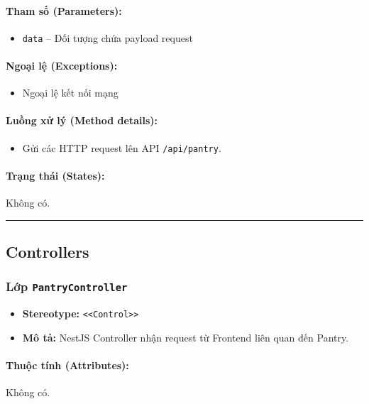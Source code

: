 \documentclass[12pt,a4paper]{article}
\begin{document}
\paragraph{Tham số (Parameters):}
\begin{itemize}[leftmargin=*]
    \item \texttt{data} – Đối tượng chứa payload request
\end{itemize}


\paragraph{Ngoại lệ (Exceptions):}
\begin{itemize}[leftmargin=*]
    \item Ngoại lệ kết nối mạng
\end{itemize}


\paragraph{Luồng xử lý (Method details):}
\begin{itemize}[leftmargin=*]
    \item Gửi các HTTP request lên API \texttt{/api/pantry}.
\end{itemize}


\paragraph{Trạng thái (States):}
Không có.

\vskip 0.5cm
\noindent\rule{\textwidth}{0.5pt}
\vskip 0.5cm

\subsection{Controllers}

\subsubsection{Lớp \texttt{PantryController}}
\begin{itemize}[leftmargin=*]
    \item \textbf{Stereotype:} \texttt{\textless{}\textless{}Control\textgreater{}\textgreater{}}
    \item \textbf{Mô tả:} NestJS Controller nhận request từ Frontend liên quan đến Pantry.
\end{itemize}

\paragraph{Thuộc tính (Attributes):}
Không có.
\end{document}
